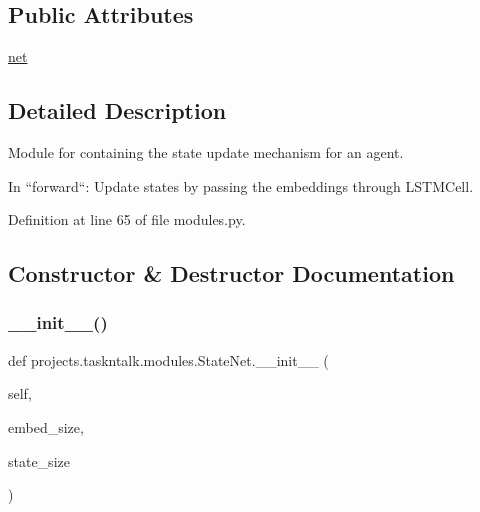 \subsection*{Public Attributes}
\begin{DoxyCompactItemize}
\item 
\hyperlink{classprojects_1_1taskntalk_1_1modules_1_1StateNet_a4499c3c6f15bc68c514202ed019f4eff}{net}
\end{DoxyCompactItemize}


\subsection{Detailed Description}
\begin{DoxyVerb}Module for containing the state update mechanism for an agent.

In
``forward``: Update states by passing the embeddings through LSTMCell.
\end{DoxyVerb}
 

Definition at line 65 of file modules.\+py.



\subsection{Constructor \& Destructor Documentation}
\mbox{\label{classprojects_1_1taskntalk_1_1modules_1_1StateNet_a46a465e3b5b7b29d39d29e76829bf229}} 
\subsubsection{\texorpdfstring{\+\_\+\+\_\+init\+\_\+\+\_\+()}{\_\_init\_\_()}}
{\footnotesize\ttfamily def projects.\+taskntalk.\+modules.\+State\+Net.\+\_\+\+\_\+init\+\_\+\+\_\+ (\begin{DoxyParamCaption}\item[{}]{self,  }\item[{}]{embed\+\_\+size,  }\item[{}]{state\+\_\+size }\end{DoxyParamCaption})}



